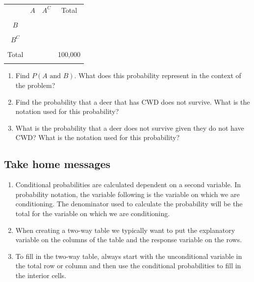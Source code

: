 \documentclass[
]{report}
\begin{document}
\begin{center}
\begin{tabular}{|c|c|c|c|} \hline
\hspace{0.8in} & \hspace{0.35in} $A$ \hspace{.35in} & \hspace{0.35in} $A^C$  \hspace{0.35in} & \hspace{0.3in} Total \hspace{0.3in} \\ 
& & & \\ \hline
$B$& & & \\ 
& & & \\ \hline
$B^C$& & & \\ 
& & & \\ \hline
Total & & & 100,000 \\ 
& & & \\ \hline
\end{tabular}
\end{center}
\vspace{.1in}

\begin{enumerate}
\def\labelenumi{\alph{enumi}.}
\setcounter{enumi}{2}
\item
  Find \(P(A \mbox{ and } B)\). What does this probability represent in the context of the problem?
  \vspace{.8in}
\item
  Find the probability that a deer that has CWD does not survive. What is the notation used for this probability?
  \vspace{.8in}
\item
  What is the probability that a deer does not survive given they do not have CWD? What is the notation used for this probability?
\end{enumerate}

\newpage

\subsection{Take home messages}\label{take-home-messages-3}

\begin{enumerate}
\def\labelenumi{\arabic{enumi}.}
\item
  Conditional probabilities are calculated dependent on a second variable. In probability notation, the variable following \texttt{\textbar{}} is the variable on which we are conditioning. The denominator used to calculate the probability will be the total for the variable on which we are conditioning.
\item
  When creating a two-way table we typically want to put the explanatory variable on the columns of the table and the response variable on the rows.
\item
  To fill in the two-way table, always start with the unconditional variable in the total row or column and then use the conditional probabilities to fill in the interior cells.
\end{enumerate}
\end{document}
